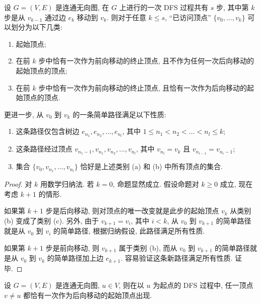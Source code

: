 \begin{lemma}
    设 $G=(V,E)$ 是连通无向图, 在 $G$ 上进行的一次 DFS 过程共有 $s$ 步, 其中第 $k$ 步是从 $v_{k-1}$ 通过边 $e_k$ 移动到 $v_k$. 则对于任意 $k\leq s$, ``已访问顶点'' $\{v_0,\dots,v_k\}$ 可以划分为以下几类:
    \begin{enumerate}[itemindent=0ex, itemsep=0pt, label=\upshape{(\alph*)}]
        \item 起始顶点;
        \item 在前 $k$ 步中恰有一次作为前向移动的终止顶点, 且不作为任何一次后向移动的起始顶点的顶点;
        \item 在前 $k$ 步中恰有一次作为前向移动的终止顶点, 且恰有一次作为后向移动的起始顶点的顶点.
    \end{enumerate}

    更进一步, 从 $v_0$ 到 $v_k$ 的一条简单路径满足以下性质:
    \begin{enumerate}[itemindent=0ex, itemsep=0pt, label=\upshape{(\alph*)}]
        \item 这条路径仅包含树边 $e_{n_1},e_{n_2},\dots,e_{n_l}$, 其中 $1\leq n_1<n_2<\dots<n_l\leq k$;
        \item 这条路径经过顶点 $v_{n_1-1}, v_{n_1}, v_{n_2}, \dots, v_{n_l}$, 其中 $v_{n_l}=v_k$ 且 $v_{n_{i-1}}=v_{{n_i}-1}$; 
        \item 集合 $\{v_0, v_{n_1}, \dots, v_{n_l}\}$ 恰好是上述类别 \textup{(a)} 和 \textup{(b)} 中所有顶点的集合.
    \end{enumerate}
\end{lemma}

\begin{proof}
    对 $k$ 用数学归纳法. 若 $k=0$, 命题显然成立. 假设命题对 $k\geq 0$ 成立, 现在考虑 $k+1$ 的情形. 

    如果第 $k+1$ 步是后向移动, 则对顶点的唯一改变就是此步的起始顶点 $v_k$ 从类别 (b) 变成了类别 (c). 另外, 由于 $v_{k+1}=v_i$, 其中 $i<k$, 从 $v_0$ 到 $v_{k+1}$ 的简单路径就是从 $v_0$ 到 $v_i$ 的简单路径, 根据归纳假设, 此路径满足所有性质.

    如果第 $k+1$ 步是前向移动, 则 $v_{k+1}$ 属于类别 (b), 而从 $v_0$ 到 $v_{k+1}$ 的简单路径就是从 $v_0$ 到 $v_k$ 的简单路径加上边 $e_{k+1}$. 容易验证这条新路径满足所有性质. 证毕.
\end{proof}

\begin{corollary}
    设 $G=(V,E)$ 是连通无向图, $u\in V$, 则在以 $u$ 为起点的 DFS 过程中, 任一顶点 $v\neq u$ 都恰有一次作为后向移动的起始顶点出现.
\end{corollary}

